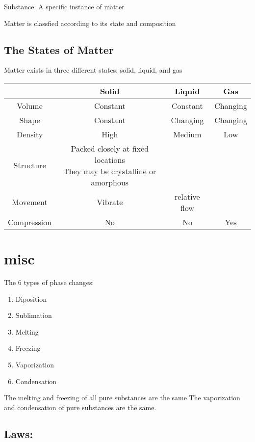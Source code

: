 \documentclass[openany]{book}
\begin{document}
Substance: A specific instance of matter

Matter is classfied according to its state and composition

\subsection{The States of Matter}

Matter exists in three different states: solid, liquid,
and gas

\begin{tabular}{c | c c c}
	              & Solid & Liquid & Gas        \\
	\midrule
	Volume        & 
	Constant      & 
	Constant      & 
	Changing                                    \\
	Shape         & 
	Constant      & 
	Changing      & 
	Changing                                    \\
	Density       & 
	High          & 
	Medium        & 
	Low                                         \\
	Structure     & 
	\makecell{Packed closely at fixed locations \\ They may be crystalline or amorphous}&
	\\
	Movement      & 
	Vibrate       & 
	relative flow & 
	\\
	Compression   & 
	No            & 
	No            & 
	Yes                                         \\
	
\end{tabular}

\section{misc}

The 6 types of phase changes:
\begin{enumerate}
	\item Diposition
	\item Sublimation
	\item Melting
	\item Freezing
	\item Vaporization
	\item Condensation
\end{enumerate}

The melting and freezing of all pure substances are the same
The vaporization and condensation of pure substances are the same.

\subsection{Laws:}
\end{document}
